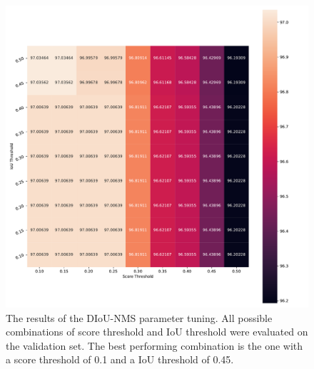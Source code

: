 \begin{figure}[H]
\begin{center}
    \includegraphics[width=\columnwidth]{imgs/yolo_diou_heat.pdf}
    \caption{The results of the \ac{DIoU}-\ac{NMS} parameter tuning. All possible combinations of score threshold and \ac{IoU} threshold were evaluated on the validation set. The best performing combination is the one with a score threshold of 0.1 and a \ac{IoU} threshold of 0.45.}
    \label{fig:diou_nms_tuning}
\end{center}
\end{figure}

